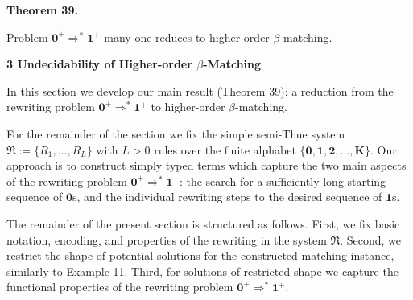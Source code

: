\documentclass[10pt,a4paper]{amsart}
\begin{document}
 

 
\par\medskip\noindent\textbf{Theorem 39.}\par
 
 
Problem $\mathbf{0}^{+}\Rightarrow^{*}\mathbf{1}^{+}$ many-one reduces to higher-order $\beta$-matching.\par
 
 

 
\par\medskip\noindent\textbf{3 Undecidability of Higher-order $\beta$-Matching}\par
 
 
In this section we develop our main result (Theorem 39): a reduction from the rewriting problem $\mathbf{0}^{+}\Rightarrow^{*}\mathbf{1}^{+}$ to higher-order $\beta$-matching.\par
 
 
 
For the remainder of the section we fix the simple semi-Thue system $\mathfrak{R}:=\{R_{1},\ldots,R_{L}\}$ with $L>0$ rules over the finite alphabet $\{\mathbf{0},\mathbf{1},\mathbf{2},\ldots,\mathbf{K}\}$. Our approach is to construct simply typed terms which capture the two main aspects of the rewriting problem $\mathbf{0}^{+}\Rightarrow^{*}\mathbf{1}^{+}$: the search for a sufficiently long starting sequence of $\mathbf{0}$s, and the individual rewriting steps to the desired sequence of $\mathbf{1}$s.\par
 
 
 
The remainder of the present section is structured as follows. First, we fix basic notation, encoding, and properties of the rewriting in the system $\mathfrak{R}$. Second, we restrict the shape of potential solutions for the constructed matching instance, similarly to Example 11. Third, for solutions of restricted shape we capture the functional properties of the rewriting problem $\mathbf{0}^{+}\Rightarrow^{*}\mathbf{1}^{+}$.\par
 
\end{document}

